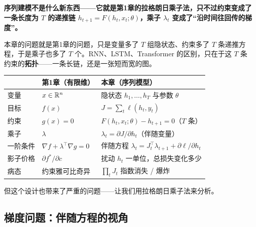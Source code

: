 \begin{tcolorbox}[colback=yellow!10, colframe=orange!80, title=本章的核心观点]
\textbf{序列建模不是什么新东西——它就是第1章的拉格朗日乘子法，只不过约束变成了一条长度为 $T$ 的递推链 $h_{t+1} = F(h_t, x_t; \theta)$，乘子 $\lambda_t$ 变成了“沿时间往回传的梯度”。}

本章的问题就是第1章的问题，只是变量多了 $T$ 组隐状态、约束多了 $T$ 条递推方程，于是乘子也多了 $T$ 个。RNN、LSTM、Transformer 的区别，只在于这 $T$ 条约束的\textbf{拓扑}——一条长链，还是一张短而宽的图。

\begin{center}
\renewcommand{\arraystretch}{1.3}
\small
\begin{tabularx}{\linewidth}{lXX}
\toprule
 & \textbf{第1章（有限维）} & \textbf{本章（序列模型）} \\
\midrule
变量 & $x \in \mathbb{R}^n$ & 隐状态 $h_1, \ldots, h_T$ 与参数 $\theta$ \\
目标 & $f(x)$ & $J = \sum_t \ell(h_t, y_t)$ \\
约束 & $g(x) = 0$ & $F(h_t, x_t; \theta) - h_{t+1} = 0$（$T$ 条） \\
乘子 & $\lambda$ & $\lambda_t = \partial J/\partial h_t$（伴随变量） \\
一阶条件 & $\nabla f + \lambda^\top \nabla g = 0$ & 伴随方程 $\lambda_t = J_t^\top \lambda_{t+1} + \partial \ell/\partial h_t$ \\
影子价格 & $\partial f^*/\partial c$ & 扰动 $h_t$ 一单位，总损失变化多少 \\
病态 & 约束雅可比奇异 & $\prod_t J_t$ 指数消失 / 爆炸 \\
\bottomrule
\end{tabularx}
\end{center}
\end{tcolorbox}

但这个设计也带来了严重的问题——让我们用拉格朗日乘子法来分析。

\subsection{梯度问题：伴随方程的视角}

